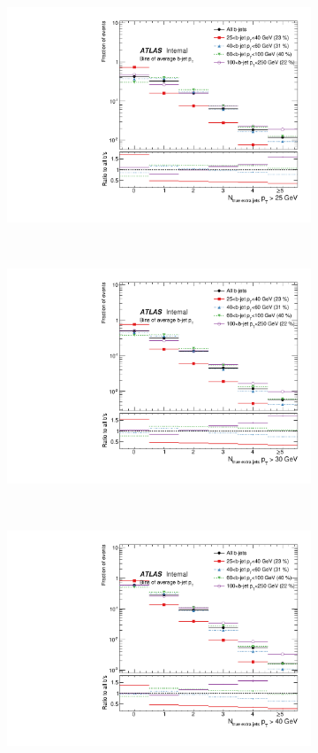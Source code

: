 \begin{figure}
\centering
\begin{subfigure}[]{0.45\textwidth}
\includegraphics[width=\textwidth]{fig/TruthNotReco/BJetNJets25.pdf}
\end{subfigure}
~
\begin{subfigure}[]{0.45\textwidth}
\includegraphics[width=\textwidth]{fig/TruthNotReco/BJetNJets30.pdf}
\end{subfigure}
~
\begin{subfigure}[]{0.45\textwidth}
\includegraphics[width=\textwidth]{fig/TruthNotReco/BJetNJets40.pdf}

\end{subfigure}
\end{figure}
